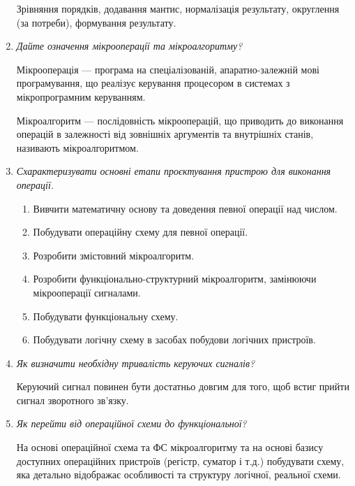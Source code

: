 \documentclass[12pt,a4paper]{article}
\begin{document}
\begin{enumerate}
        Зрівняння порядків, додавання мантис, нормалізація результату, округлення (за потреби), формування результату.

        \vspace{1em}

        \item \textit{Дайте означення мікрооперації та мікроалгоритму?}
        
        Мікрооперація --- програма на спеціалізованій, апаратно-залежній мові програмування, що реалізує керування процесором в системах з мікропрограмним керуванням.

        Мікроалгоритм --- послідовність мікрооперацій, що приводить до виконання операцій в залежності від зовнішніх аргументів та внутрішніх станів, називають мікроалгоритмом.

        \item \textit{Схарактеризувати основні етапи проєктування пристрою для виконання операції.}
        
        \begin{enumerate}
            \item Вивчити математичну основу та доведення певної операції над числом.
            \item Побудувати операційну схему для певної операції.
            \item Розробити змістовний мікроалгоритм.
            \item Розробити функціонально-структурний мікроалгоритм, замінюючи мікрооперації сигналами.
            \item Побудувати функціональну схему.
            \item Побудувати логічну схему в засобах побудови логічних пристроїв.
        \end{enumerate}

        \vspace{1em}

        \item \textit{Як визначити необхідну тривалість керуючих сигналів?}
        
        Керуючий сигнал повинен бути достатньо довгим для того, щоб встиг прийти сигнал зворотного зв'язку.

        \vspace{1em}

        \item \textit{Як перейти від операційної схеми до функціональної?}
        
        На основі операційної схема та ФС мікроалгоритму та на основі базису доступних операційних пристроїв (регістр, суматор і т.д.) побудувати схему, яка детально відображає особливості та структуру
        логічної, реальної схеми.


\end{enumerate}
\end{document}
